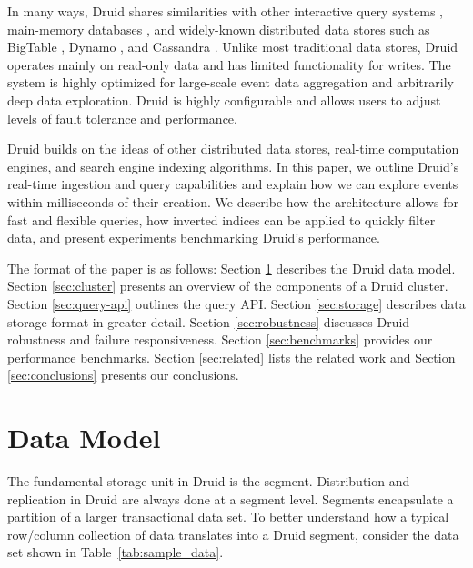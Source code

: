 \documentclass{vldb}
\begin{document}
In many ways, Druid shares similarities with other interactive query systems
\cite{melnik2010dremel}, main-memory databases \cite{farber2012sap}, and widely-known distributed data
stores such as BigTable \cite{chang2008bigtable}, Dynamo \cite{decandia2007dynamo}, and Cassandra \cite{lakshman2010cassandra}. Unlike
most traditional data stores, Druid operates mainly on read-only data
and has limited functionality for writes. The system is highly optimized
for large-scale event data aggregation and arbitrarily deep data exploration. Druid is highly configurable
and allows users to adjust levels of fault tolerance and
performance.

Druid builds on the ideas of other distributed data stores, real-time
computation engines, and search engine indexing algorithms. In this
paper, we outline Druid's real-time ingestion and query capabilities
and explain how we can explore events within milliseconds of their
creation.  We describe how the architecture allows for fast and flexible
queries, how inverted indices can be applied to quickly filter
data, and present experiments benchmarking Druid’s performance.

The format of the paper is as follows: Section \ref{sec:data-model} describes the Druid
data model. Section \ref{sec:cluster} presents an overview of the components of a
Druid cluster. Section \ref{sec:query-api} outlines the query API. Section \ref{sec:storage} describes
data storage format in greater detail. Section \ref{sec:robustness} discusses Druid
robustness and failure responsiveness. Section \ref{sec:benchmarks} provides our
performance benchmarks. Section \ref{sec:related} lists the related work and Section \ref{sec:conclusions} presents
our conclusions.

\section{Data Model}
\label{sec:data-model}
The fundamental storage unit in Druid is the segment. Distribution and
replication in Druid are always done at a segment level. Segments
encapsulate a partition of a larger transactional data set. To better
understand how a typical row/column collection of data translates into
a Druid segment, consider the data set shown in Table~\ref{tab:sample_data}.
\end{document}
